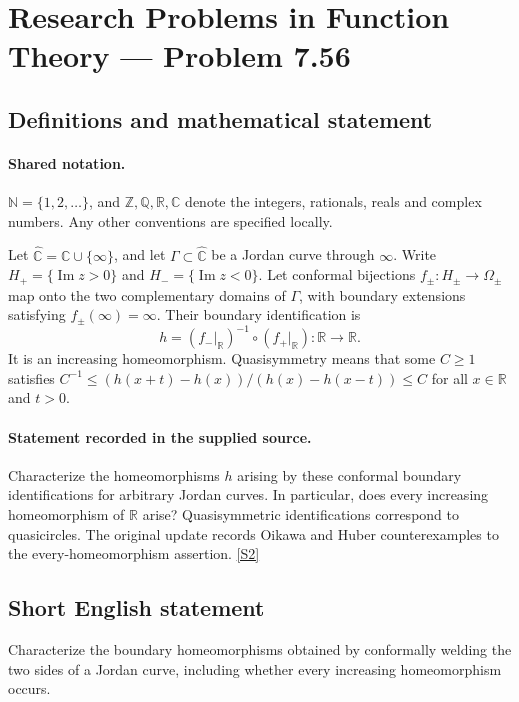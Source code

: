 \documentclass[11pt]{article}
\newcommand{\sref}[2]{\hyperlink{source:#1:#2}{[S#2]}}
\begin{document}
\section{Research Problems in Function Theory — Problem 7.56}\label{statement}

\subsection{Definitions and mathematical statement}

\paragraph{Shared notation.}$\mathbb N=\{1,2,\ldots\}$, and $\mathbb Z,\mathbb Q,\mathbb R,\mathbb C$ denote the integers, rationals, reals and complex numbers. Any other conventions are specified locally.


Let $\widehat{\mathbb C}=\mathbb C\cup\{\infty\}$, and let $\Gamma\subset\widehat{\mathbb C}$ be a Jordan curve through $\infty$. Write $H_+=\{\operatorname{Im}z>0\}$ and $H_-=\{\operatorname{Im}z<0\}$. Let conformal bijections $f_\pm:H_\pm\to\Omega_\pm$ map onto the two complementary domains of $\Gamma$, with boundary extensions satisfying $f_\pm(\infty)=\infty$. Their boundary identification is
\[h=(f_-|_{\mathbb R})^{-1}\circ(f_+|_{\mathbb R}):\mathbb R\to\mathbb R.
\]
It is an increasing homeomorphism. Quasisymmetry means that some $C\ge1$ satisfies $C^{-1}\le(h(x+t)-h(x))/(h(x)-h(x-t))\le C$ for all $x\in\mathbb R$ and $t>0$.
\paragraph{Statement recorded in the supplied source.}
Characterize the homeomorphisms $h$ arising by these conformal boundary identifications for arbitrary Jordan curves. In particular, does every increasing homeomorphism of $\mathbb R$ arise? Quasisymmetric identifications correspond to quasicircles. The original update records Oikawa and Huber counterexamples to the every-homeomorphism assertion. \sref{statement}{2}
\subsection{Short English statement}
Characterize the boundary homeomorphisms obtained by conformally welding the two sides of a Jordan curve, including whether every increasing homeomorphism occurs.
\end{document}
